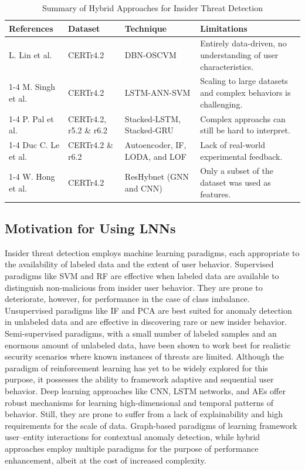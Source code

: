 \begin{table}[!ht]
\caption{Summary of Hybrid Approaches for Insider Threat Detection}
\begin{tabular}{p{2.5cm}p{3cm}  p{2cm}  p{4.5cm} }
\toprule
\textbf{References} & \textbf{Dataset} & \textbf{Technique}  & \textbf{Limitations} \\
\midrule
L. Lin et al. \cite{lin2017insider} & CERTr4.2& DBN-OSCVM & Entirely data-driven, no understanding of user characteristics. \\
\cmidrule(lr){1-4}
 M. Singh et al. \cite{singh2023user}& CERTr4.2& LSTM-ANN-SVM & Scaling to large datasets and complex behaviors is challenging. \\
\cmidrule(lr){1-4}
 P. Pal et al. \cite{pal2023temporal} &  CERTr4.2, r5.2 \& r6.2& Stacked-LSTM, Stacked-GRU & Complex approachs can still be hard to interpret. \\
\cmidrule(lr){1-4}
 Duc C. Le et al.  \cite{le2021anomaly} & CERTr4.2 \& r6.2& Autoencoder, IF, LODA, and LOF & Lack of real-world experimental feedback. \\
\cmidrule(lr){1-4}
W. Hong et al. \cite{hong2023graph} & CERTr4.2& ResHybnet (GNN and CNN) & Only a subset of the dataset was used as features. \\
\bottomrule
\end{tabular}

\label{tbl4}
\end{table}

\subsection{Motivation for Using LNNs}
Insider threat detection employs machine learning paradigms, each appropriate to the availability of labeled data and the extent of user behavior. Supervised paradigms like SVM and RF are effective when labeled data are available to distinguish non-malicious from insider user behavior. They are prone to deteriorate, however, for performance in the case of class imbalance. Unsupervised paradigms like IF and PCA are best suited for anomaly detection in unlabeled data and are effective in discovering rare or new insider behavior. Semi-supervised paradigms, with a small number of labeled samples and an enormous amount of unlabeled data, have been shown to work best for realistic security scenarios where known instances of threats are limited. Although the paradigm of reinforcement learning has yet to be widely explored for this purpose, it possesses the ability to framework adaptive and sequential user behavior. Deep learning approaches like CNN, LSTM networks, and AEs offer robust mechanisms for learning high-dimensional and temporal patterns of behavior. Still, they are prone to suffer from a lack of explainability and high requirements for the scale of data. Graph-based paradigms of learning framework user–entity interactions for contextual anomaly detection, while hybrid approaches employ multiple paradigms for the purpose of performance enhancement, albeit at the cost of increased complexity.

